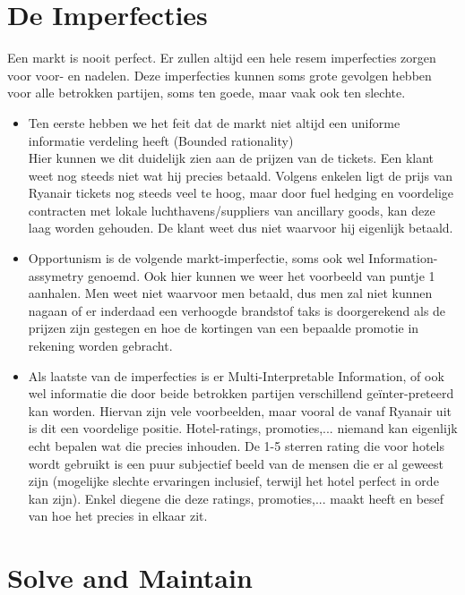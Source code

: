 \documentclass{article}
\begin{document}
 \section{De Imperfecties}	
Een markt is nooit perfect. Er zullen altijd een hele resem imperfecties zorgen voor voor- en nadelen. Deze imperfecties kunnen soms grote gevolgen hebben voor alle betrokken partijen, soms ten goede, maar vaak ook ten slechte.
\begin{itemize}
\item Ten eerste hebben we het feit dat de markt niet altijd een uniforme informatie verdeling heeft (Bounded rationality) \\
Hier kunnen we dit duidelijk zien aan de prijzen van de tickets. Een klant weet nog steeds niet wat hij precies betaald. Volgens enkelen ligt de prijs van Ryanair tickets nog steeds veel te hoog, maar door fuel hedging en voordelige contracten met lokale luchthavens/suppliers van ancillary goods, kan deze laag worden gehouden. De klant weet dus niet waarvoor hij eigenlijk betaald.

\item Opportunism is de volgende markt-imperfectie, soms ook wel Information-assymetry genoemd. Ook hier kunnen we weer het voorbeeld van puntje 1 aanhalen. Men weet niet waarvoor men betaald, dus men zal niet kunnen nagaan of er inderdaad een verhoogde brandstof taks is doorgerekend als de prijzen zijn gestegen en hoe de kortingen van een bepaalde promotie in rekening worden gebracht.

\item Als laatste van de imperfecties is er Multi-Interpretable Information, of ook wel informatie die door beide betrokken partijen verschillend ge\"inter-preteerd kan worden. Hiervan zijn vele voorbeelden, maar vooral de vanaf Ryanair uit is dit een voordelige positie. Hotel-ratings, promoties,... niemand kan eigenlijk echt bepalen wat die precies inhouden. De 1-5 sterren rating die voor hotels wordt gebruikt is een puur subjectief beeld van de mensen die er al geweest zijn (mogelijke slechte ervaringen inclusief, terwijl het hotel perfect in orde kan zijn). Enkel diegene die deze ratings, promoties,... maakt heeft en besef van hoe het precies in elkaar zit.
\end{itemize}
\newpage

\section{Solve and Maintain}
\end{document}
